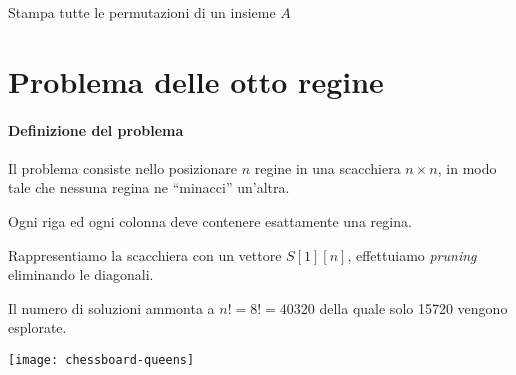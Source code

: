 \begin{algorithm}[H]
\caption{Stampa tutte le permutazioni di un insieme \(A\)}


\end{algorithm}

\section{Problema delle otto regine}

\begin{minipage}[c]{.675\textwidth}
\paragraph{Definizione del problema}
Il problema consiste nello posizionare \(n\) regine in una scacchiera \(n \times n\), in modo tale che nessuna regina ne \enquote{minacci} un'altra.

\begin{idea}
Ogni riga ed ogni colonna deve contenere esattamente una regina.
\end{idea}

Rappresentiamo la scacchiera con un vettore \(S[1][n]\), effettuiamo \emph{pruning} eliminando le diagonali.

Il numero di soluzioni ammonta a \(n! = 8! = \num{40320}\) della quale solo \num{15720} vengono esplorate.
\end{minipage}\hfill
\begin{minipage}[c]{.3\textwidth}
	\centering
		\texttt{[image: chessboard-queens]}
\end{minipage}

